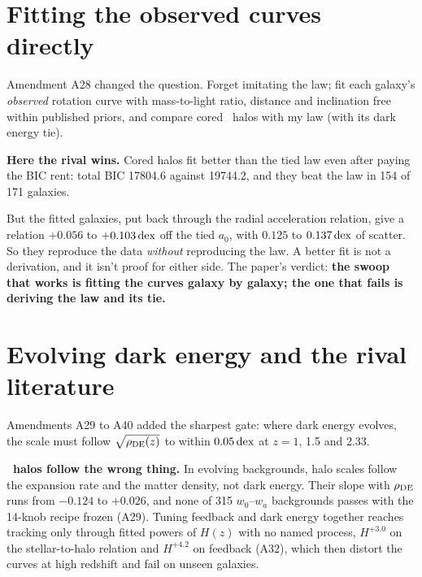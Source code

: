 

\section{Fitting the observed curves directly}

Amendment A28 changed the question. Forget imitating the law; fit each galaxy's \emph{observed} rotation curve with mass-to-light ratio, distance and inclination free within published priors, and compare cored \LCDM\ halos with my law (with its dark energy tie).

\textbf{Here the rival wins.} Cored halos fit better than the tied law even after paying the BIC rent: total BIC 17804.6 against 19744.2, and they beat the law in 154 of 171 galaxies.




But the fitted galaxies, put back through the radial acceleration relation, give a relation $+0.056$ to $+0.103\,\mathrm{dex}$ off the tied $a_0$, with $0.125$ to $0.137\,\mathrm{dex}$ of scatter. So they reproduce the data \emph{without} reproducing the law. A better fit is not a derivation, and it isn't proof for either side. The paper's verdict: \textbf{the swoop that works is fitting the curves galaxy by galaxy; the one that fails is deriving the law and its tie.}

\section{Evolving dark energy and the rival literature}

Amendments A29 to A40 added the sharpest gate: where dark energy evolves, the scale must follow $\sqrt{\rho_{\rm DE}(z)}$ to within $0.05\,\mathrm{dex}$ at $z=1$, 1.5 and 2.33.

\textbf{\LCDM\ halos follow the wrong thing.} In evolving backgrounds, halo scales follow the expansion rate and the matter density, not dark energy. Their slope with $\rho_{\rm DE}$ runs from $-0.124$ to $+0.026$, and none of 315 $w_0$--$w_a$ backgrounds passes with the 14-knob recipe frozen (A29). Tuning feedback and dark energy together reaches tracking only through fitted powers of $H(z)$ with no named process, $H^{+3.0}$ on the stellar-to-halo relation and $H^{+4.2}$ on feedback (A32), which then distort the curves at high redshift and fail on unseen galaxies.

